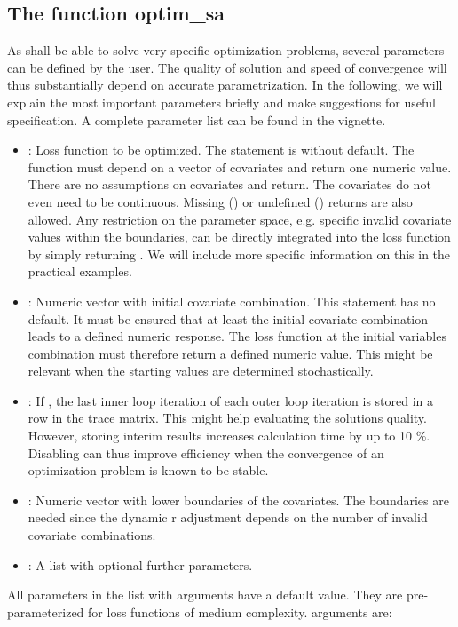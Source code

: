 \subsection{The function optim\_sa}
As  shall be able to solve very specific optimization problems, several parameters can be defined by the user. The quality of solution and speed of convergence will thus substantially depend on accurate parametrization. In the following, we will explain the most important parameters briefly and make suggestions for useful specification. A complete parameter list can be found in the vignette.
\begin{itemize}
\item {}: Loss function to be optimized. The statement is without default. The function must depend on a vector of covariates and return one numeric value. There are no assumptions on covariates and return. The covariates do not even need to be continuous. Missing () or undefined () returns are also allowed. Any restriction on the parameter space, e.g. specific invalid covariate values within the boundaries, can be directly integrated into the loss function by simply returning . We will include more specific information on this in the practical examples.
\item {}: Numeric vector with initial covariate combination. This statement has no default. It must be ensured that at least the initial covariate combination leads to a defined numeric response. The loss function at the initial variables combination must therefore return a defined numeric value. This might be relevant when the starting values are determined stochastically.
\item {}: If , the last inner loop iteration of each outer loop iteration is stored in a row in the trace matrix. This might help evaluating the solutions quality. However, storing interim results increases calculation time by up to 10 \%. Disabling  can thus improve efficiency when the convergence of an optimization problem is known to be stable.
\item {}: Numeric vector with lower boundaries of the covariates. The boundaries are needed since the dynamic r adjustment \citep{corana_1987, pronzato_1984} depends on the number of invalid covariate combinations.
\item {}: A list with optional further parameters.
\end{itemize}
All parameters in the list with  arguments have a default value. They are pre-parameterized for loss functions of medium complexity.  arguments are:
